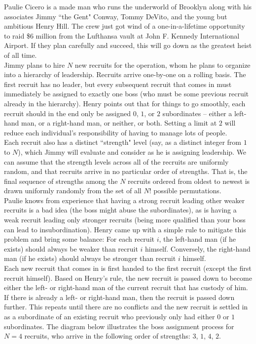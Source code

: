 
\noindent Paulie Cicero is a made man who runs the underworld of Brooklyn along with his associates Jimmy ``the Gent" Conway, Tommy DeVito, and the young but ambitious Henry Hill. The crew just got wind of a one-in-a-lifetime opportunity to raid \$6 million from the Lufthansa vault at John F. Kennedy International Airport. If they plan carefully and succeed, this will go down as the greatest heist of all time.\\

Jimmy plans to hire $N$ new recruits for the operation, whom he plans to organize into a hierarchy of leadership. Recruits arrive one-by-one on a rolling basis. The first recruit has no leader, but every subsequent recruit that comes in must immediately be assigned to exactly one boss (who must be some previous recruit already in the hierarchy). Henry points out that for things to go smoothly, each recruit should in the end only be assigned $0$, $1$, or $2$ subordinates -- either a left-hand man, or a right-hand man, or neither, or both. Setting a limit at $2$ will reduce each individual's responsibility of having to manage lots of people.\\

Each recruit also has a distinct ``strength" level (say, as a distinct integer from $1$ to $N$), which Jimmy will evaluate and consider as he is assigning leadership. We can assume that the strength levels across all of the recruits are uniformly random, and that recruits arrive in no particular order of strengths. That is, the final sequence of strengths among the $N$ recruits ordered from oldest to newest is drawn uniformly randomly from the set of all $N!$ possible permutations.\\

Paulie knows from experience that having a strong recruit leading other weaker recruits is a bad idea (the boss might abuse the subordinates), as is having a weak recruit leading only stronger recruits (being more qualified than your boss can lead to insubordination). Henry came up with a simple rule to mitigate this problem and bring some balance: For each recruit $i$, the left-hand man (if he exists) should always be weaker than recruit $i$ himself. Conversely, the right-hand man (if he exists) should always be stronger than recruit $i$ himself.\\

Each new recruit that comes in is first handed to the first recruit (except the first recruit himself). Based on Henry's rule, the new recruit is passed down to become either the left- or right-hand man of the current recruit that has custody of him. If there is already a left- or right-hand man, then the recruit is passed down further. This repeats until there are no conflicts and the new recruit is settled in as a subordinate of an existing recruit who previously only had either $0$ or $1$ subordinates. The diagram below illustrates the boss assignment process for $N = 4$ recruits, who arrive in the following order of strengths: $3$, $1$, $4$, $2$.\\

